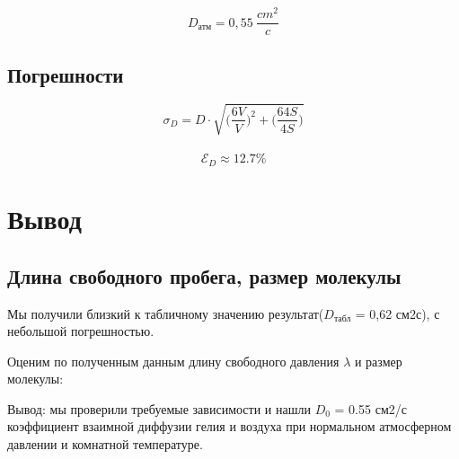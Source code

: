 \documentclass[a4paper,12pt]{article}
\theoremstyle{plain} %
\theoremstyle{definition} %
\theoremstyle{remark} %
\begin{document}
\[D_\text{атм} = 0,55\  \dfrac{cm^2}{c} \]


\subsection{Погрешности}
\[\sigma_D = D \cdot \sqrt{\big( \dfrac{6V}{V} \big)^2 + \big(\dfrac{64S}{4S} \big)} \]\\
\[\mathcal{E}_D \approx 12.7 \%  \]

\section{Вывод}
\subsection{Длина свободного пробега, размер молекулы }

\begin{center}
\end{center}

Мы получили близкий к табличному значению результат($D_\text{табл}$ = 0,62 см2с), с небольшой погрешностью.

Оценим по полученным данным длину свободного давления $\lambda$ и размер молекулы:

\begin{center}
\end{center}


\begin{center}
\end{center}

Вывод: мы проверили требуемые зависимости и нашли $D_0$ = 0.55 см2/с коэффициент взаимной диффузии гелия и воздуха при нормальном атмосферном давлении и комнатной температуре.
\end{document}
